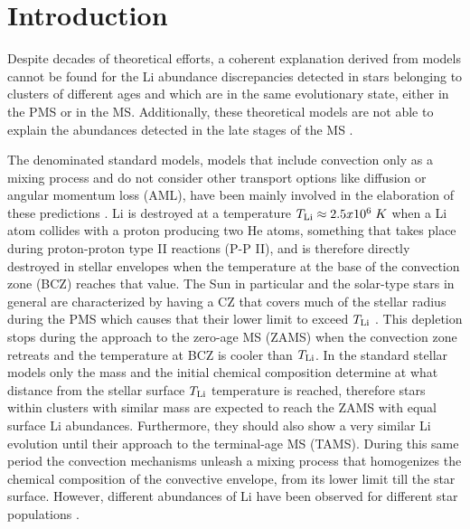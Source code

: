 \documentclass[fleqn,usenatbib]{mnras}
\begin{document}


\section{Introduction} \label{sec_1}
Despite decades of theoretical efforts, a coherent explanation derived from models cannot be found for the Li abundance discrepancies detected in stars belonging to clusters of different ages and which are in the same evolutionary state, either in the PMS or in the MS. Additionally, these theoretical models are not able to explain the abundances detected in the late stages of the MS \citep{Tschape2001}.\par

The denominated standard models, models that include convection only as a mixing process and do not consider other transport options like diffusion or angular momentum loss (AML), have been mainly involved in the elaboration of these predictions \citep{Sestito2005}. Li is destroyed at a temperature $T_{\mathrm{Li}} \approx 2.5 x 10^6\; K$ when a Li atom collides with a proton producing two He atoms, something that takes place during proton-proton type II reactions (P-P II), and is therefore directly destroyed in stellar envelopes when the temperature at the base of the convection zone (BCZ) reaches that value. The Sun in particular and the solar-type stars in general are characterized by having a CZ that covers much of the stellar radius during the PMS which causes that their lower limit to exceed $T_{\mathrm{Li}}$ \citep{Iben1965}. This depletion stops during the approach to the zero-age MS (ZAMS) when the convection zone retreats and the temperature at BCZ is cooler than $T_{\mathrm{Li}}$. In the standard stellar models only the mass and the initial chemical composition determine at what distance from the stellar surface $T_{\mathrm{Li}}$ temperature is reached, therefore stars within clusters with similar mass are expected to reach the ZAMS with equal surface Li abundances. Furthermore, they should also show a very similar Li evolution until their approach to the terminal-age MS (TAMS). During this same period the convection mechanisms unleash a mixing process that homogenizes the chemical composition of the convective envelope, from its lower limit till the star surface. However, different abundances of Li have been observed for different star populations \citep[][and references therein]{Somers2014}.\par
\end{document}
